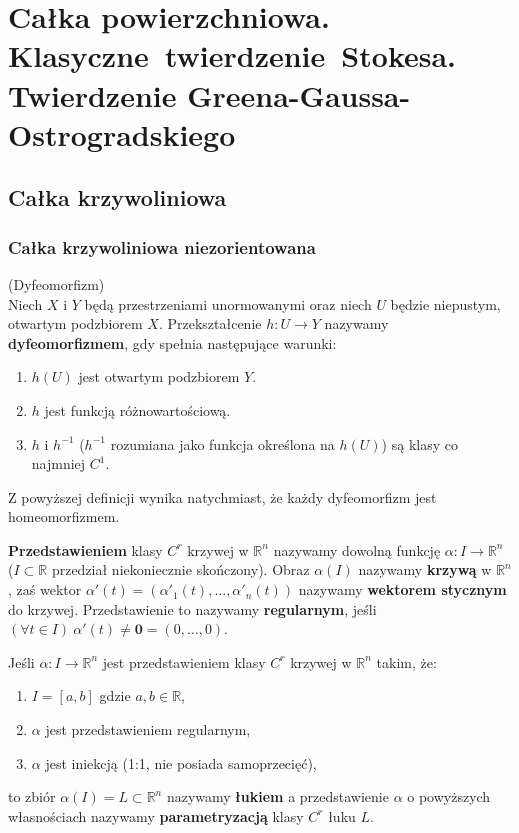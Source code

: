 \chapter{Całka powierzchniowa. Klasyczne~twierdzenie~Stokesa. Twierdzenie Greena-Gaussa-Ostrogradskiego}

\section{Całka krzywoliniowa}

\subsection{Całka krzywoliniowa niezorientowana}

\begin{df}{(Dyfeomorfizm)}\\
	Niech $X$ i $Y$ będą przestrzeniami unormowanymi oraz niech $U$ będzie niepustym, otwartym podzbiorem $X$. Przekształcenie $h:U\rightarrow Y$ nazywamy \textbf{dyfeomorfizmem}, gdy spełnia następujące warunki:
	\begin{enumerate}[\rm 1.]
		\item
		$h(U)$ jest otwartym podzbiorem $Y$.
		\item
		$h$ jest funkcją różnowartościową.
		\item
		$h$ i $h^{-1}$ ($h^{-1}$ rozumiana jako funkcja określona na $h(U)$) są klasy co najmniej $C^1$.
	\end{enumerate}
	Z powyższej definicji wynika natychmiast, że każdy dyfeomorfizm jest homeomorfizmem.
\end{df}

\begin{df}
	\textbf{Przedstawieniem} klasy $C^{r}$ krzywej w $\mathbb{R}^{n}$ nazywamy dowolną funkcję \mbox{$\alpha:I\rightarrow \mathbb{R}^{n}$}
	($I\subset \mathbb{R}$ przedział niekoniecznie skończony). Obraz $\alpha(I)$ nazywamy \textbf{krzywą} w $\mathbb{R}^{n}$, zaś wektor $\alpha'(t)=(\alpha'_{1}(t),\ldots,\alpha'_{n}(t))$ nazywamy \textbf{wektorem stycznym} do krzywej. Przedstawienie to nazywamy \textbf{regularnym}, jeśli
	$(\forall t\in I) \ \alpha'(t)\neq\textbf{0}=(0,\ldots,0)$.
\end{df}

\begin{df}
	Jeśli $\alpha:I\rightarrow \mathbb{R}^{n}$ jest przedstawieniem klasy $C^{r}$ krzywej w $\mathbb{R}^{n}$ takim, że:
	\begin{enumerate}
		\item $I=[a,b]$ gdzie $a,b\in\mathbb{R}$,
		\item $\alpha$ jest przedstawieniem regularnym,
		\item $\alpha$ jest iniekcją (1:1, nie posiada samoprzecięć),
	\end{enumerate}
	to zbiór $\alpha(I)=L\subset \mathbb{R}^{n}$ nazywamy \textbf{łukiem} a przedstawienie $\alpha$ o powyższych własnościach nazywamy \textbf{parametryzacją} klasy $C^{r}$ łuku $L$.
\end{df}


